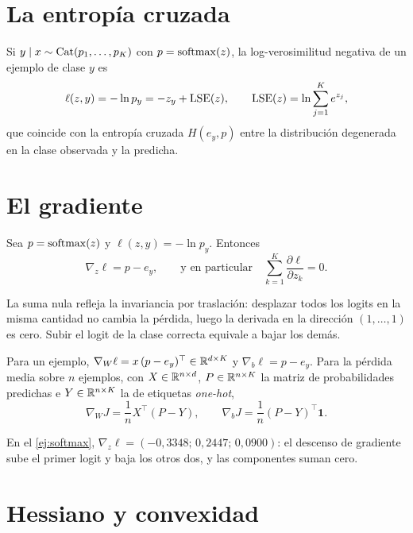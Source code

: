 \section{La entropía cruzada}

\begin{proposicion}\label{prop:ce}
Si $y\mid x\sim\operatorname{Cat}(p_1,\dots,p_K)$ con $p=\operatorname{softmax}(z)$, la log-verosimilitud negativa de un ejemplo de clase $y$ es
\[
\ell(z,y)=-\ln p_y=-z_y+\operatorname{LSE}(z),\qquad \operatorname{LSE}(z)=\ln\sum_{j=1}^{K}e^{z_j},
\]
que coincide con la entropía cruzada $H(e_y,p)$ entre la distribución degenerada en la clase observada y la predicha.
\end{proposicion}

\addtocounter{definicion}{1}%

\section{El gradiente}

\begin{teorema}\label{teo:grad-softmax}
Sea $p=\operatorname{softmax}(z)$ y $\ell(z,y)=-\ln p_y$. Entonces
\[
\nabla_z\ell=p-e_y,\qquad\text{y en particular}\quad\sum_{k=1}^{K}\frac{\partial\ell}{\partial z_k}=0.
\]
\end{teorema}

La suma nula refleja la invariancia por traslación: desplazar todos los logits en la misma cantidad no cambia la pérdida, luego la derivada en la dirección $(1,\dots,1)$ es cero. Subir el logit de la clase correcta equivale a bajar los demás.

\begin{corolario}\label{cor:grad-W}
Para un ejemplo, $\nabla_W\ell=x\,(p-e_y)^{\top}\in\mathbb{R}^{d\times K}$ y $\nabla_b\ell=p-e_y$. Para la pérdida media sobre $n$ ejemplos, con $X\in\mathbb{R}^{n\times d}$, $P\in\mathbb{R}^{n\times K}$ la matriz de probabilidades predichas e $Y\in\mathbb{R}^{n\times K}$ la de etiquetas \emph{one-hot},
\[
\nabla_W J=\frac{1}{n}X^{\top}(P-Y),\qquad \nabla_bJ=\frac1n(P-Y)^{\top}\mathbf{1}.
\]
\end{corolario}

En el \cref{ej:softmax}, $\nabla_z\ell=(-0{,}3348;\,0{,}2447;\,0{,}0900)$: el descenso de gradiente sube el primer logit y baja los otros dos, y las componentes suman cero.

\section{Hessiano y convexidad}

